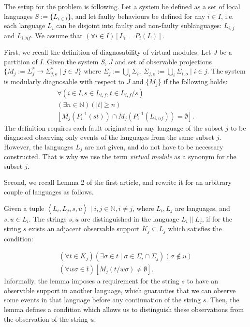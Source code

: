 \documentclass[a4paper, 10pt, conference]{ieeeconf}
\begin{document}
The setup for the problem is following. Let a system be defined as a set of
local languages $S := \{L_{i\in I}\}$, and let faulty behaviours be defined for
any $i \in I$, i.e. each language $L_i$ can be disjoint into faulty and
non-faulty sublanguages: $L_{i,f}$ and $L_{i,nf}$. We assume that $(\forall i
\in I)\left[ L_i = P_i(L)\right]$.

First, we recall the definition of diagnosability of virtual modules. Let $J$ be
a partition of $I$. Given the system $S$, $J$ and set of observable
projections $\{M_j := \Sigma_j^* \rightarrow \Sigma_{j,o}^* \mid j \in J \}$
where $\Sigma_j := \bigcup_i \Sigma_i,~ 
	\Sigma_{j,o} := \bigcup_i \Sigma_{i,o} \mid 
	i\in j$. 
The system is modularly diagnosable with respect to $J$ and $\{M_j\}$ 
if the following holds:
\begin{equation}
	\begin{array}{l}
		\forall(i \in I, s \in L_{i,f}, t \in L_{i,f}/s)
		\\
		(\exists n \in \mathbb{N})
		(|t| \geq n)
		\\
		\left[ M_j(P_i^{-1}(st)) \cap M_j(P_i^{-1}(L_{i,nf})) = \emptyset \right].
	\end{array}
\end{equation}
The definition requires each fault originated in any language of the subset $j$
to be diagnosed observing only events of the languages from the same subset $j$.
However, the languages $L_j$ are not given, and do not have to be necessary
constructed. That is why we use the term \emph{virtual module} as a synonym for
the subset $j$.

Second, we recall Lemma 2 of the first article, and rewrite it for an arbitrary
couple of languages as follows.

\begin{lemma}
Given a tuple $\left< L_i, L_j, s, u\right> \mid i, j \in \mathbb{N}, i\neq j$,
where $L_i, L_j$ are languages, and $s, u \in L_i$. The strings $s, u$ are
distinguished in the language $L_i \parallel L_j$, if for the string $s$ exists
an adjacent observable support $K_j \subseteq L_j$ which satisfies the
condition:
\end{lemma} 
\begin{equation}
\label{con:distinquished}
	\begin{array}{l}
	 	(\forall t \in K_j)
	 	(\exists \sigma \in t \mid \sigma \in \Sigma_i \cap \Sigma_j)
	 	(\sigma \not \in u)
	 	\\
	 	(\forall w\sigma \in \overline{t})
	 	[M_j(t / w\sigma) \neq \emptyset].
	\end{array}
\end{equation}
Informally, the lemma imposes a requirement for the string $s$ to have an
observable support in another language, which guaranties that we can observe some
events in that language before any continuation of the string $s$.
Then, the lemma defines a condition which allows us to distinguish these
observations from the observation of the string $u$.
\end{document}
